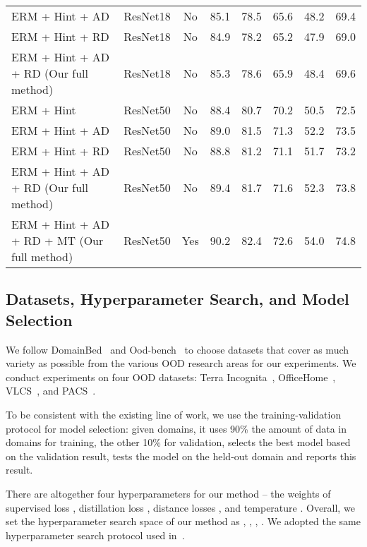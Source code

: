 \documentclass[10pt,twocolumn,letterpaper]{article}
\begin{document}
\begin{table*}[h]
\begin{tabular}{l|c | c | c c c c | c}
ERM + Hint + AD       & ResNet18 & No & 85.1 & 78.5 & 65.6 & 48.2 &  69.4 \\
ERM + Hint + RD       & ResNet18 & No & 84.9 & 78.2 & 65.2 & 47.9 &  69.0\\
\rowcolor{lightgray!30}ERM + Hint + AD + RD (Our full method) & ResNet18 & No & 85.3 & 78.6  & 65.9 & 48.4 &  69.6\\
\hline
ERM + Hint & ResNet50& No & 88.4 & 80.7 & 70.2 & 50.5 &  72.5\\
ERM + Hint + AD      & ResNet50& No & 89.0 & 81.5 & 71.3 & 52.2 &  73.5\\
ERM + Hint + RD      & ResNet50& No & 88.8 & 81.2 & 71.1 & 51.7 &  73.2\\
\rowcolor{lightgray!30}ERM + Hint + AD + RD (Our full method) & ResNet50& No & 89.4 & 81.7 & 71.6 & 52.3 &   73.8\\
\rowcolor{lightgray!30}ERM + Hint + AD + RD + MT (Our full method) & ResNet50  & Yes & 90.2 & 82.4 & 72.6 & 54.0 &  74.8 \\
\hline
\end{tabular}
\end{table*}





\subsection{Datasets, Hyperparameter Search, and Model
Selection}

We follow DomainBed~\cite{gulrajani2020search} and Ood-bench~\cite{ye2021ood} to choose datasets that cover as much variety as possible from the various OOD research areas for our experiments. We conduct experiments on four OOD datasets:  Terra Incognita~\cite{beery2018terra}, OfficeHome~\cite{venkateswara2017officehome}, VLCS~\cite{torralba2011vlcs}, and PACS~\cite{li2017pacs}.

To be consistent with the existing line of work, we use the training-validation protocol for model selection: given  domains, it uses 90\% the amount of data in  domains for training, the other 10\% for validation, selects the best model based on the validation result, tests the model on the held-out domain and reports this result. 

There are altogether four hyperparameters for our method -- the weights of supervised loss , distillation loss , distance losses , and temperature . Overall, we set the hyperparameter search space of our method as , , , .
We adopted the same hyperparameter search protocol used in~\cite{gulrajani2020search,ye2022ood}.
\end{document}
